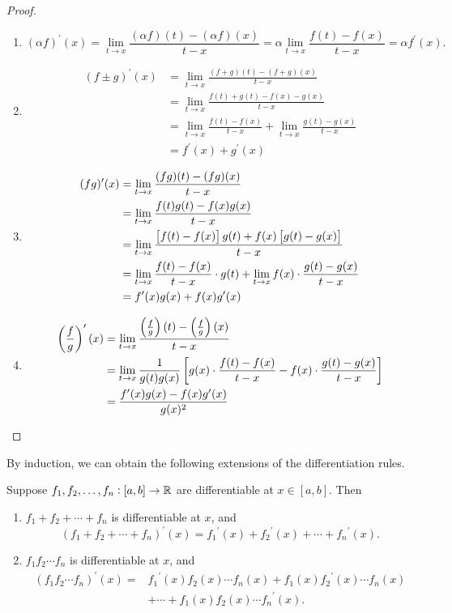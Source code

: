 \begin{proof} \
\begin{enumerate}[label=(\roman*)]
\item \[(\alpha f)^\prime(x)=\lim_{t\to x}\frac{(\alpha f)(t)-(\alpha f)(x)}{t-x}=\alpha\lim_{t\to x}\frac{f(t)-f(x)}{t-x}=\alpha f^\prime(x).\]
\item \begin{align*}
(f\pm g)^\prime(x)
&=\lim_{t\to x}\frac{(f+g)(t)-(f+g)(x)}{t-x}\\
&=\lim_{t\to x}\frac{f(t)+g(t)-f(x)-g(x)}{t-x}\\
&=\lim_{t\to x}\frac{f(t)-f(x)}{t-x}+\lim_{t\to x}\frac{g(t)-g(x)}{t-x}\\
&=f^\prime(x)+g^\prime(x)
\end{align*}

\item \begin{align*}
(fg)^\prime(x)
&=\lim_{t\to x}\frac{(fg)(t)-(fg)(x)}{t-x}\\
&=\lim_{t\to x}\frac{f(t)g(t)-f(x)g(x)}{t-x}\\
&=\lim_{t\to x}\frac{\left[f(t)-f(x)\right]g(t)+f(x)\left[g(t)-g(x)\right]}{t-x}\\
&=\lim_{t\to x}\frac{f(t)-f(x)}{t-x}\cdot g(t)+\lim_{t\to x}f(x)\cdot\frac{g(t)-g(x)}{t-x}\\
&=f^\prime(x)g(x)+f(x)g^\prime(x)
\end{align*}

\item \begin{align*}
\left(\frac{f}{g}\right)^\prime(x)
&=\lim_{t\to x}\frac{\left(\frac{f}{g}\right)(t)-\left(\frac{f}{g}\right)(x)}{t-x}\\
&=\lim_{t\to x}\frac{1}{g(t)g(x)}\left[g(x)\cdot\frac{f(t)-f(x)}{t-x}-f(x)\cdot\frac{g(t)-g(x)}{t-x}\right]\\
&=\frac{f^\prime(x)g(x)-f(x)g^\prime(x)}{g(x)^2}
\end{align*}
\end{enumerate}
\end{proof}

By induction, we can obtain the following extensions of the differentiation rules.

\begin{corollary}
Suppose $f_1,f_2,\dots,f_n:[a,b]\to\mathbb R$ are differentiable at $x\in[a,b]$. Then
\begin{enumerate}[label=(\roman*)]
\item $f_1+f_2+\cdots+f_n$ is differentiable at $x$, and
\[(f_1+f_2+\cdots+f_n)^\prime(x)={f_1}^\prime(x)+{f_2}^\prime(x)+\cdots+{f_n}^\prime(x).\]
\item $f_1f_2\cdots f_n$ is differentiable at $x$, and
\begin{align*}
(f_1f_2\cdots f_n)^\prime(x)
=&{f_1}^\prime(x)f_2(x)\cdots f_n(x)+f_1(x){f_2}^\prime(x)\cdots f_n(x)\\
&+\cdots+f_1(x)f_2(x)\cdots {f_n}^\prime(x).
\end{align*}
\end{enumerate}
\end{corollary}

